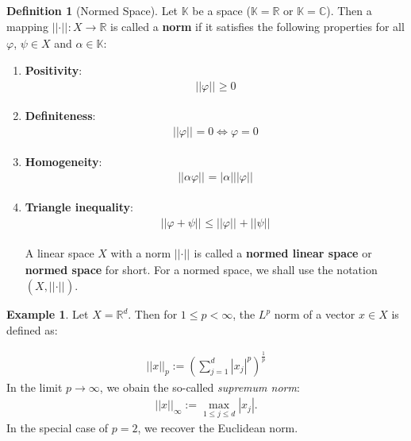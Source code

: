\documentclass[12pt, a4paper]{article}
\numberwithin{equation}{section}
\theoremstyle{definition}
\theoremstyle{definition}
\newtheorem{defn}[thm]{Definition} %
\newtheorem{exmp}[thm]{Example} %
\newcommand{\norm}[2]{\left\vert\left\vert #1 \right\vert\right\vert_{#2}}
\newcommand{\abs}[1]{\left\vert #1 \right\vert}
\begin{document}
	\begin{defn}[Normed Space]\label{defn:normed_space}
		Let $\mathbb K$ be a space ($\mathbb{K} = \mathbb{R}$ or $\mathbb{K} = \mathbb{C}$). Then a mapping $\norm{\cdot}{}: X\to\mathbb{R}$ is called a \textbf{norm} if it satisfies the following properties for all $\varphi$, $\psi\in X$ and $\alpha\in \mathbb{K}$:
		
		\begin{enumerate}
			\item \textbf{Positivity}:
			\begin{align}
				\norm{\varphi}{} \geq 0
			\end{align}

			\item \textbf{Definiteness}:
			\begin{align}
				\norm{\varphi}{} = 0 \Leftrightarrow \varphi = 0
			\end{align}
		
			\item \textbf{Homogeneity}:
			\begin{align}
				\norm{\alpha\varphi}{} = \abs{\alpha}\norm{\varphi}{}
			\end{align}
		
			\item \textbf{Triangle inequality}:
			\begin{align}
				\norm{\varphi + \psi}{} \leq \norm{\varphi}{} + \norm{\psi}{}
			\end{align}
			
			A linear space $X$ with a norm $\norm{\cdot}{}$ is called a \textbf{normed linear space} or \textbf{normed space} for short. For a normed space, we shall use the notation $\left(X, \norm{\cdot}{}\right)$.
			
		\end{enumerate}
	\end{defn}

	\begin{exmp}
		Let $X = \mathbb{R}^d$. Then for $1 \leq p < \infty$, the $L^p$ norm of a vector $x\in X$ is defined as:
		
		\begin{align}\label{eq:L^p_norm}
			\norm{x}{p} := \left(\sum_{j=1}^{d}\abs{x_j}^p\right)^{\frac{1}{p}}
		\end{align}
		In the limit $p\to\infty$, we obain the so-called \textit{supremum norm}:
		\begin{align}\label{eq:sup_norm}
			\norm{x}{\infty} := \max_{1\leq j\leq d}{\abs{x_j}}.
		\end{align} 
		In the special case of $p = 2$, we recover the Euclidean norm.
	\end{exmp}
	
\end{document}

